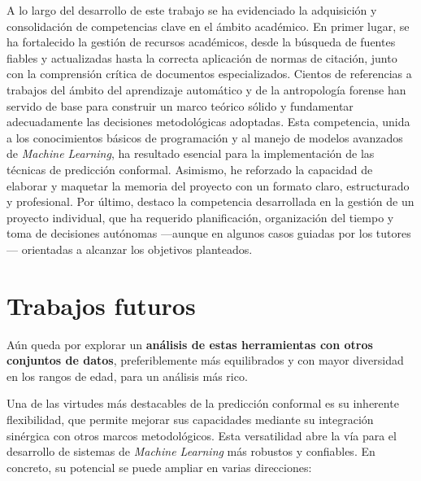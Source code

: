 A lo largo del desarrollo de este trabajo se ha evidenciado la adquisición y consolidación de competencias clave en el ámbito académico. En primer lugar, se ha fortalecido la gestión de recursos académicos, desde la búsqueda de fuentes fiables y actualizadas hasta la correcta aplicación de normas de citación, junto con la comprensión crítica de documentos especializados. Cientos de referencias a trabajos del ámbito del aprendizaje automático y de la antropología forense han servido de base para construir un marco teórico sólido y fundamentar adecuadamente las decisiones metodológicas adoptadas.
Esta competencia, unida a los conocimientos básicos de programación y al manejo de modelos avanzados de \textit{Machine Learning}, ha resultado esencial para la implementación de las técnicas de predicción conformal.
Asimismo, he reforzado la capacidad de elaborar y maquetar la memoria del proyecto con un formato claro, estructurado y profesional.
Por último, destaco la competencia desarrollada en la gestión de un proyecto individual, que ha requerido planificación, organización del tiempo y toma de decisiones autónomas ---aunque en algunos casos guiadas por los tutores--- orientadas a alcanzar los objetivos planteados.



\section{Trabajos futuros}


Aún queda por explorar un \textbf{análisis de estas herramientas con otros conjuntos de datos}, preferiblemente más equilibrados y con mayor diversidad en los rangos de edad, para un análisis más rico.

Una de las virtudes más destacables de la predicción conformal es su inherente flexibilidad, que permite mejorar sus capacidades mediante su integración sinérgica con otros marcos metodológicos. Esta versatilidad abre la vía para el desarrollo de sistemas de \textit{Machine Learning} más robustos y confiables. En concreto, su potencial se puede ampliar en varias direcciones:

